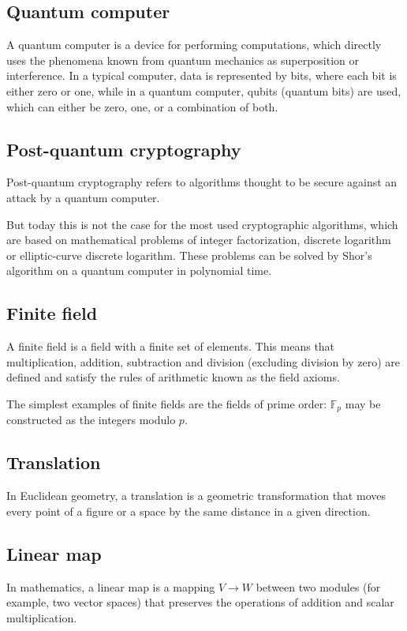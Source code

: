 \documentclass[thesis=M,english]{FITthesis}[2019/12/23]
\begin{document}
\subsection{Quantum computer}
A quantum computer is a device for performing computations, which directly uses the phenomena known from quantum mechanics as superposition or interference. In a typical computer, data is represented by bits, where each bit is either zero or one, while in a quantum computer, qubits (quantum bits) are used, which can either be zero, one, or a combination of both.

\subsection{Post-quantum cryptography}
Post-quantum cryptography refers to algorithms thought to be secure against an attack by a quantum computer.

But today this is not the case for the most used cryptographic algorithms, which are based on mathematical problems of integer factorization, discrete logarithm or elliptic-curve discrete logarithm. These problems can be solved by Shor's algorithm on a quantum computer in polynomial time.

\subsection{Finite field}
A finite field is a field with a finite set of elements. This means that multiplication, addition, subtraction and division (excluding division by zero) are defined and satisfy the rules of arithmetic known as the field axioms.

The simplest examples of finite fields are the fields of prime order: $\mathbb {F}_{p}$ may be constructed as the integers modulo $p$.

\subsection{Translation}
In Euclidean geometry, a translation is a geometric transformation that moves every point of a figure or a space by the same distance in a given direction.

\subsection{Linear map}
In mathematics, a linear map is a mapping $V \rightarrow W$ between two modules (for example, two vector spaces) that preserves the operations of addition and scalar multiplication.
\end{document}
